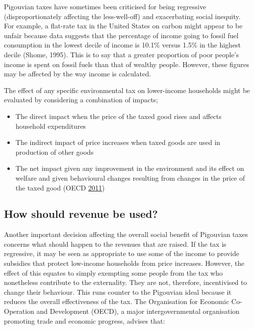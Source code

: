 \documentclass[]{tufte-handout}
\providecommand{\tightlist}{%
  \setlength{\itemsep}{0pt}\setlength{\parskip}{0pt}}
\begin{document}
Pigouvian taxes have sometimes been criticised for being regressive
(disproportionately affecting the less-well-off) and exacerbating social
inequity. For example, a flat-rate tax in the United States on carbon
might appear to be unfair because data suggests that the percentage of
income going to fossil fuel consumption in the lowest decile of income
is 10.1\% versus 1.5\% in the highest decile (Shome, 1995). This is to
say that a greater proportion of poor people's income is spent on fossil
fuels than that of wealthy people. However, these figures may be
affected by the way income is calculated.

The effect of any specific environmental tax on lower-income households
might be evaluated by considering a combination of impacts;

\begin{itemize}
\tightlist
\item
  The direct impact when the price of the taxed good rises and affects
  household expenditures
\item
  The indirect impact of price increases when taxed goods are used in
  production of other goods
\item
  The net impact given any improvement in the environment and its effect
  on welfare and given behavioural changes resulting from changes in the
  price of the taxed good (OECD \protect\hyperlink{ref-OECD2011}{2011})
\end{itemize}

\hypertarget{how-should-revenue-be-used}{%
\subsection{How should revenue be
used?}\label{how-should-revenue-be-used}}

Another important decision affecting the overall social benefit of
Pigouvian taxes concerns what should happen to the revenues that are
raised. If the tax is regressive, it may be seen as appropriate to use
some of the income to provide subsidies that protect low-income
households from price increases. However, the effect of this equates to
simply exempting some people from the tax who nonetheless contribute to
the externality. They are not, therefore, incentivised to change their
behaviour. This runs counter to the Pigouvian ideal because it reduces
the overall effectiveness of the tax. The Organisation for Economic
Co-Operation and Development (OECD), a major intergovernmental
organisation promoting trade and economic progress, advises that:
\end{document}
